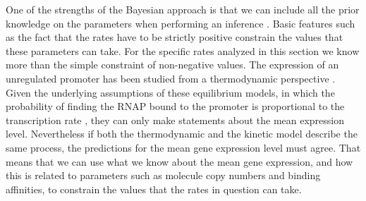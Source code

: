 One of the strengths of the Bayesian approach is that we can include all the
prior knowledge on the parameters when performing an inference
\cite{MacKay2003}. Basic features such as the fact that the rates have to be
strictly positive constrain the values that these parameters can take. For
the specific rates analyzed in this section we know more than the simple
constraint of non-negative values. The expression of an unregulated promoter has
been studied from a thermodynamic perspective \cite{Brewster2012}. Given the
underlying assumptions of these equilibrium models, in which the probability of
finding the RNAP bound to the promoter is proportional to the transcription
rate \cite{Bintu2005a}, they can only make statements about the mean expression
level. Nevertheless if both the thermodynamic and the kinetic model describe
the same process, the predictions for the mean gene expression level must
agree. That means that we can use what we know about the mean gene expression,
and how this is related to parameters such as molecule copy numbers and binding
affinities, to constrain the values that the rates in question can take.

